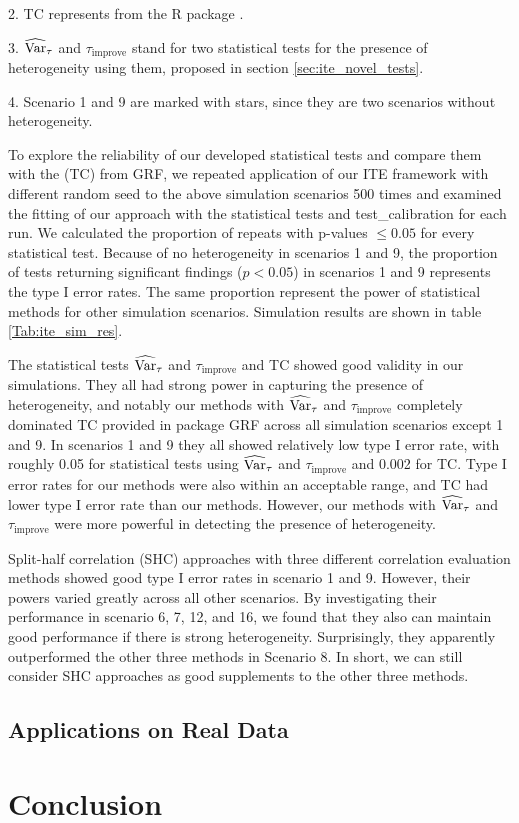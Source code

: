 \begin{table}[htbp]
\begin{threeparttable}
\begin{tablenotes}
            \item 2. TC represents  from the R package .
            \item 3. $\operatorname{\widehat{Var}}_{\tau}$ and $\tau_{\mathrm{improve}}$ stand for two statistical tests for the presence of heterogeneity using them, proposed in section \ref{sec:ite_novel_tests}.
            \item 4. Scenario 1 and 9 are marked with stars, since they are two scenarios without heterogeneity.
          \end{tablenotes}
      \end{threeparttable}
    \label{Tab:ite_sim_res}%
    \end{table}%

    To explore the reliability of our developed statistical tests and compare them with the  (TC) from GRF, we repeated application of our ITE framework with different random seed to the above simulation scenarios 500 times and examined the fitting of our approach with the statistical tests and test\_calibration for each run. We calculated the proportion of repeats with p-values $\leq 0.05$ for every statistical test. Because of no heterogeneity in scenarios 1 and 9, the proportion of tests returning significant findings ($p <0.05$) in scenarios 1 and 9 represents the type I error rates. The same proportion represent the power of statistical methods for other simulation scenarios. Simulation results are shown in table \ref{Tab:ite_sim_res}.

    The statistical tests $\operatorname{\widehat{Var}}_{\tau}$ and $\tau_{\mathrm{improve}}$ and TC showed good validity in our simulations. They all had strong power in capturing the presence of heterogeneity, and notably our methods with $\operatorname{\widehat{Var}}_{\tau}$ and $\tau_{\mathrm{improve}}$ completely dominated TC provided in package GRF across all simulation scenarios except 1 and 9. In scenarios 1 and 9 they all showed relatively low type I error rate, with roughly 0.05 for statistical tests using $\operatorname{\widehat{Var}}_{\tau}$ and $\tau_{\mathrm{improve}}$ and 0.002 for TC. Type I error rates for our methods were also within an acceptable range, and TC had lower type I error rate than our methods. However, our methods with $\operatorname{\widehat{Var}}_{\tau}$ and $\tau_{\mathrm{improve}}$ were more powerful in detecting the presence of heterogeneity.

    Split-half correlation (SHC) approaches with three different correlation evaluation methods showed good type I error rates in scenario 1 and 9. However,  their powers varied greatly across all other scenarios. By investigating their performance in scenario 6, 7, 12, and 16, we found that they also can maintain good performance if there is strong heterogeneity. Surprisingly, they apparently outperformed the other three methods in Scenario 8. In short, we can still consider SHC approaches as good supplements to the other three methods.

  \subsection{Applications on Real Data}
\section{Conclusion}
\label{sec:ite_conclusion}
\chapterend